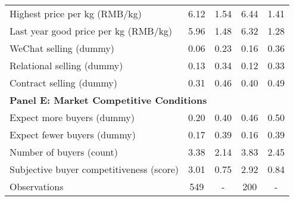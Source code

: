 \begin{table}[htbp]
\begin{tabular}{lcccc}
Highest price per kg (RMB/kg) & 6.12 & 1.54 & 6.44 & 1.41 \\ 
Last year good price per kg (RMB/kg) & 5.96 & 1.48 & 6.32 & 1.28 \\ 
WeChat selling (dummy) & 0.06 & 0.23 & 0.16 & 0.36 \\ 
Relational selling (dummy) & 0.13 & 0.34 & 0.12 & 0.33 \\ 
Contract selling (dummy) & 0.31 & 0.46 & 0.40 & 0.49 \\ 
\hline
\multicolumn{5}{l}{\textbf{Panel E: Market Competitive Conditions}} \\

Expect more buyers (dummy) & 0.20 & 0.40 & 0.46 & 0.50 \\ 
Expect fewer buyers (dummy) & 0.17 & 0.39 & 0.16 & 0.39 \\ 
Number of buyers (count) & 3.38 & 2.14 & 3.83 & 2.45 \\ 
Subjective buyer competitiveness (score) & 3.01 & 0.75 & 2.92 & 0.84 \\ 
\hline
Observations & 549 & - & 200 & - \\
\hline
\end{tabular}
\end{table}
